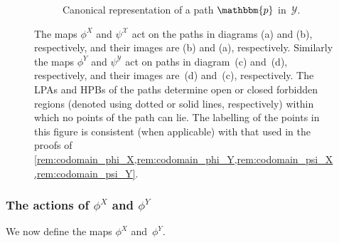 \documentclass[11pt]{article}
\theoremstyle{definition} %
\numberwithin{equation}{section}
\begin{document}
\begin{figure}[h!t]
\begin{center}
\begin{subfigure}{.45\textwidth}
    \caption{Canonical representation of a path $\mathbbm{p}$ in~$\mathcal{Y}$.}
    \label{fig:Y_image}
\end{subfigure}
\caption{The maps $\phi^X$ and $\psi^{\mathcal{X}}$ act on the paths in diagrams (a) and (b), respectively, and their images are (b) and (a), respectively.  Similarly the maps $\phi^Y$ and $\psi^{\mathcal{Y}}$ act on paths in diagram~(c) and~(d), respectively, and their images are~(d) and~(c), respectively. 
The LPAs and HPBs of the paths determine open or closed forbidden regions (denoted using dotted or solid lines, respectively) within which no points of the path can lie. The labelling of the points in this figure is consistent (when applicable) with that used in the proofs of \cref{rem:codomain_phi_X,rem:codomain_phi_Y,rem:codomain_psi_X,rem:codomain_psi_Y}.}
\label{fig:XY_action}
\end{center}
\end{figure}


\subsubsection{The actions of \texorpdfstring{$\phi^X$ and $\phi^Y$}{phi\^X,phi\^Y}}

We now define the maps $\phi^X$ and~$\phi^Y$.  
\end{document}
